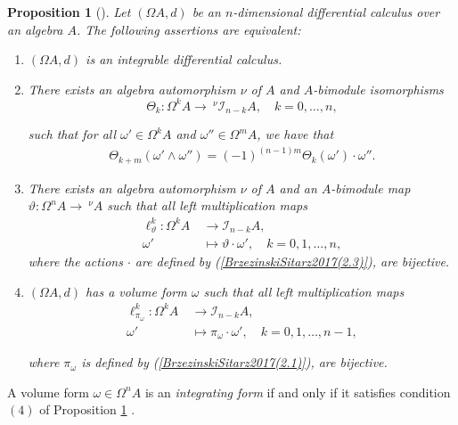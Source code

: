 \documentclass{amsart}
\newtheorem{proposition}[theorem]{Proposition}
\theoremstyle{definition}
\theoremstyle{remark}
\numberwithin{equation}{section}
\begin{document}
\begin{proposition}[{\cite[Theorem 2.2]{BrzezinskiSitarz2017}}]\label{integrableequiva} 
Let $(\Omega A, d)$ be an $n$-dimensional differential calculus over an algebra $A$. The following assertions are equivalent:
\begin{enumerate}
    \item [\rm (1)] $(\Omega A, d)$ is an integrable differential calculus.
    
    \item [\rm (2)] There exists an algebra automorphism $\nu$ of $A$ and $A$-bimodule isomorphisms 
    $$\Theta_k : \Omega^k A \rightarrow \ ^{\nu}\mathcal{I}_{n-k}A, \quad k =0, \ldots, n,
    $$
    
    such that for all $\omega'\in \Omega^k A$ and $\omega''\in \Omega^mA$, we have that 
    \begin{align*}
        \Theta_{k+m}(\omega'\wedge\omega'')=(-1)^{(n-1)m}\Theta_k(\omega')\cdot\omega''.
    \end{align*}
    
    \item [\rm (3)] There exists an algebra automorphism $\nu$ of $A$ and an $A$-bimodule map $\vartheta:\Omega^nA\rightarrow\ ^{\nu}A$ such that all left multiplication maps
    \begin{align*}
    \ell_{\vartheta}^{k}:\Omega^k A &\ \rightarrow \mathcal{I}_{n-k}A, \\
    \omega' &\ \mapsto \vartheta\cdot\omega', \quad k = 0, 1, \dotsc, n,
    \end{align*}
    where the actions $\cdot$ are defined by {\rm (}\ref{BrzezinskiSitarz2017(2.3)}{\rm )}, are bijective.
    
    \item [\rm (4)] $(\Omega A, d)$ has a volume form $\omega$ such that all left multiplication maps
    \begin{align*}
        \ell_{\pi_{\omega}}^{k}:\Omega^k A &\ \rightarrow \mathcal{I}_{n-k}A, \\
        \omega' &\ \mapsto \pi_{\omega} \cdot \omega', \quad k=0,1, \dotsc, n-1,
    \end{align*}
    
    where $\pi_{\omega}$ is defined by {\rm (}\ref{BrzezinskiSitarz2017(2.1)}{\rm )}, are bijective.
\end{enumerate}
\end{proposition}

A volume form $\omega\in \Omega^nA$ is an {\em integrating form} if and only if it satisfies condition $(4)$ of Proposition \ref{integrableequiva} \cite[Remark 2.3]{BrzezinskiSitarz2017}.
\end{document}
